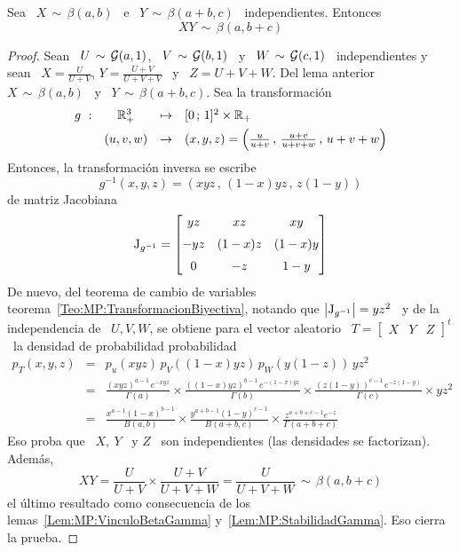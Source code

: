 %
\begin{lema}
\label{Lem:StabilidadBeta}
%
  Sea  \  $X \,  \sim  \, \beta(a,b)$  \  e  \ $Y  \,  \sim  \, \beta(a+b,c)$  \
  independientes. Entonces
  \[
  X Y \, \sim \, \beta(a,b+c)
  \]
\end{lema}
%
\begin{proof}
  Sean \ $U  \, \sim \, \mathcal{G}(a,1)$, \ $V \,  \sim \, \mathcal{G}(b,1)$ \ y \  $W \, \sim \,
  \mathcal{G}(c,1)$   \   independientes  y   sean   \   $X   =  \frac{U}{U+V}$,   $Y   =
  \frac{U+V}{U+V+V}$  \ y  \ $Z  = U+V+W$.  Del lema  anterior \  $X \,  \sim \,
  \beta(a,b)$ \ y \ $Y \, \sim \, \beta(a+b,c)$. Sea la transformaci\'on
  \[
  \begin{array}{lccl}
    g\ : & \mathbb{R}_+^3 & \mapsto & [0 \, ; \, 1]^2 \times \mathbb{R}_+\\[1.5mm]
    & (u,v,w) & \to & (x,y,z) = \left( \frac{u}{u+v} \, , \, \frac{u+v}{u+v+w} \, , \, u+v+w \right)
  \end{array}
  \]
  Entonces, la transformaci\'on inversa se escribe
  \[
  g^{-1}(x,y,z) = \left( x y z \, , \, (1-x) y z \, , \, z (1-y) \right)
  \]
  de matriz Jacobiana
  \[
  \operatorname{J}_{g^{-1}} = \begin{bmatrix}
    y z  &   x z   &   x y   \\[2mm]
  - y z  & (1-x) z & (1-x) y \\[2mm]
    0    &  - z    &  1-y
  \end{bmatrix}
  \]
  De      nuevo,      del      teorema      de     cambio      de      variables
  teorema~\ref{Teo:MP:TransformacionBiyectiva}, notando que $\left| \operatorname{J}_{g^{-1}}
  \right| = y  z^2$ \ y de la independencia  de \ $U, V, W$,  se obtiene para el
  vector aleatorio  \ $  T =  \begin{bmatrix} X &  Y &  Z \end{bmatrix}^t$  \ la
  densidad de probabilidad probabilidad
  \begin{eqnarray*}
    p_T(x,y,z) & = & p_u( x y z ) \, p_V( (1-x) y z ) \, p_W( y (1-z) ) \, y z^2\\[2mm]
    & = & \frac{\left( x y z \right)^{a-1} \, e^{- x y z}}{\Gamma(a)} \times
    \frac{\left( (1-x) y z \right)^{b-1} \, e^{- (1-x) y z}}{\Gamma(b)} \times
    \frac{\left( z (1-y) \right)^{c-1} \, e^{- z (1-y)}}{\Gamma(c)} \times y
    z^2\\[2mm]
    & = & \frac{x^{a-1} (1-x)^{b-1}}{B(a,b)} \times \frac{y^{a+b-1}
      (1-y)^{c-1}}{B(a+b,c)} \times \frac{z^{a+b+c-1} e^{-z}}{\Gamma(a+b+c)}
  \end{eqnarray*}
  Eso proba  que \  $X, \ Y$  \ y  $Z$ \ son  independientes (las  densidades se
  factorizan). Adem\'as,
  \[
  X  Y =  \frac{U}{U+V} \times  \frac{U+V}{U+V+W} =  \frac{U}{U+V+W} \,  \sim \,
  \beta(a,b+c)
  \]
  el      \'ultimo       resultado      como      consecuencia       de      los
  lemas~\ref{Lem:MP:VinculoBetaGamma}    y~\ref{Lem:MP:StabilidadGamma}.     Eso
  cierra la prueba.
\end{proof}

